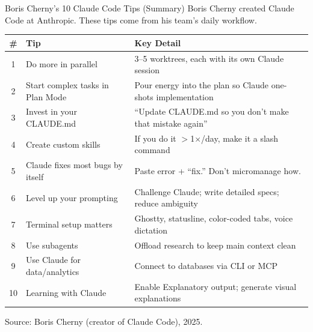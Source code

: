 \documentclass[aspectratio=169,10pt]{beamer}
\newcommand{\emphc}[1]{\textcolor{harvardcrimson}{#1}}
\begin{document}
\begin{frame}{Boris Cherny's 10 Claude Code Tips (Summary)}
\scriptsize
Boris Cherny created Claude Code at Anthropic. These tips come from his team's daily workflow.

\vspace{0.3em}
\renewcommand{\arraystretch}{1.15}
\begin{tabular}{c p{4cm} p{7cm}}
\toprule
\textbf{\#} & \textbf{Tip} & \textbf{Key Detail} \\
\midrule
1 & Do more in \emphc{parallel} & 3--5 worktrees, each with its own Claude session \\
2 & Start complex tasks in \emphc{Plan Mode} & Pour energy into the plan so Claude one-shots implementation \\
3 & Invest in your \emphc{CLAUDE.md} & ``Update CLAUDE.md so you don't make that mistake again'' \\
4 & Create custom \emphc{skills} & If you do it $>$1$\times$/day, make it a slash command \\
5 & Claude fixes most \emphc{bugs} by itself & Paste error + ``fix.'' Don't micromanage how. \\
6 & Level up your \emphc{prompting} & Challenge Claude; write detailed specs; reduce ambiguity \\
7 & \emphc{Terminal} setup matters & Ghostty, statusline, color-coded tabs, voice dictation \\
8 & Use \emphc{subagents} & Offload research to keep main context clean \\
9 & Use Claude for \emphc{data/analytics} & Connect to databases via CLI or MCP \\
10 & \emphc{Learning} with Claude & Enable Explanatory output; generate visual explanations \\
\bottomrule
\end{tabular}

\vspace{0.3em}
{\scriptsize Source: Boris Cherny (creator of Claude Code), 2025.}
\end{frame}
\end{document}
